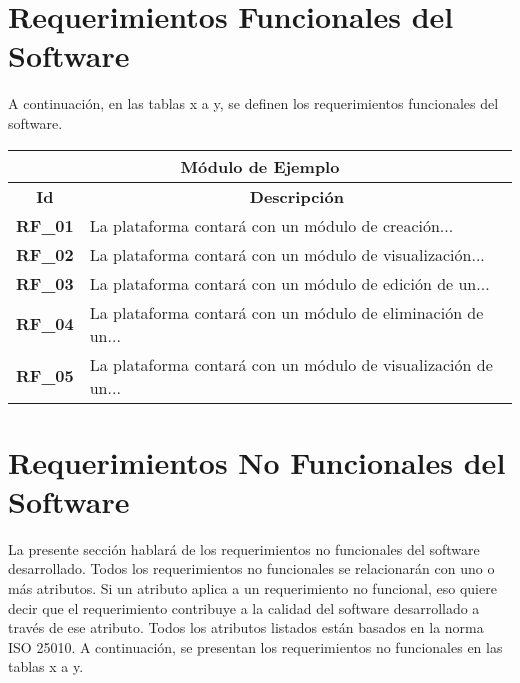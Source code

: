\section{Requerimientos Funcionales del Software}
A continuación, en las tablas x a y, se definen los requerimientos funcionales del software.
\begin{center}
	\begin{tabular}{ | l | p{15cm} |}
		\hline
		\multicolumn{2}{|c|}{\textbf{Módulo de Ejemplo}} \\
		\hline
		\multicolumn{1}{|c|}{\textbf{Id}} & \multicolumn{1}{|c|}{\textbf{Descripción}} \\
		\hline
		{\textbf{RF\_01}} & La plataforma contará con un módulo de creación... \\ \hline

		{\textbf{RF\_02}} & La plataforma contará con un módulo de visualización... \\ \hline

		{\textbf{RF\_03}} & La plataforma contará con un módulo de edición de un... \\ \hline
		
		{\textbf{RF\_04}} & La plataforma contará con un módulo de eliminación de un... \\ \hline
		
		{\textbf{RF\_05}} & La plataforma contará con un módulo de visualización de un... \\ \hline
	\end{tabular}
  
  \label{table:rf:ejemplo}
\end{center}

\section{Requerimientos No Funcionales del Software}
La presente sección hablará de los requerimientos no funcionales del software desarrollado. Todos los requerimientos no funcionales se relacionarán con uno o más atributos. Si un atributo aplica a un requerimiento no funcional, eso quiere decir que el requerimiento contribuye a la calidad del software desarrollado a través de ese atributo. Todos los atributos listados están basados en la norma ISO 25010. A continuación, se presentan los requerimientos no funcionales en las tablas x a y.

